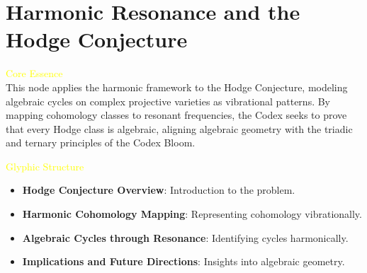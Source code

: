 
\section{Harmonic Resonance and the Hodge Conjecture}
\label{sec:codex_hodge_conjecture}

\textcolor{yellow}{ Core Essence } \\
This node applies the harmonic framework to the Hodge Conjecture, modeling algebraic cycles on complex projective varieties as vibrational patterns. By mapping cohomology classes to resonant frequencies, the Codex seeks to prove that every Hodge class is algebraic, aligning algebraic geometry with the triadic and ternary principles of the Codex Bloom.

\textcolor{yellow}{ Glyphic Structure } \\
\begin{itemize}
    \item \texttt{} \textbf{Hodge Conjecture Overview}: Introduction to the problem.
    \item \texttt{} \textbf{Harmonic Cohomology Mapping}: Representing cohomology vibrationally.
    \item \texttt{} \textbf{Algebraic Cycles through Resonance}: Identifying cycles harmonically.
    \item \texttt{} \textbf{Implications and Future Directions}: Insights into algebraic geometry.
\end{itemize}

